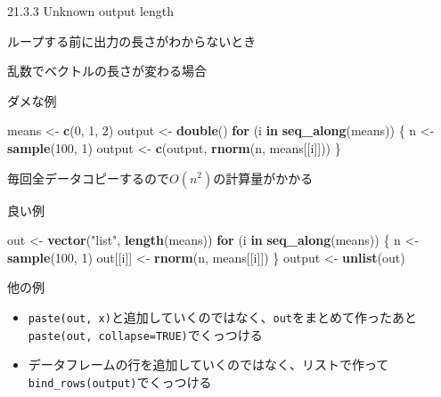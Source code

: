 \documentclass[ignorenonframetext,]{beamer}
\newenvironment{Shaded}{\begin{snugshade}}{\end{snugshade}}
\newcommand{\KeywordTok}[1]{\textcolor[rgb]{0.13,0.29,0.53}{\textbf{#1}}}
\newcommand{\DecValTok}[1]{\textcolor[rgb]{0.00,0.00,0.81}{#1}}
\newcommand{\StringTok}[1]{\textcolor[rgb]{0.31,0.60,0.02}{#1}}
\newcommand{\ControlFlowTok}[1]{\textcolor[rgb]{0.13,0.29,0.53}{\textbf{#1}}}
\newcommand{\NormalTok}[1]{#1}
\providecommand{\tightlist}{%
  \setlength{\itemsep}{0pt}\setlength{\parskip}{0pt}}
\begin{document}
\begin{frame}{21.3.3 Unknown output length}

ループする前に出力の長さがわからないとき

\end{frame}

\begin{frame}[fragile]{乱数でベクトルの長さが変わる場合}

\begin{block}{ダメな例}

\begin{Shaded}
\begin{Highlighting}[]
\NormalTok{means <-}\StringTok{ }\KeywordTok{c}\NormalTok{(}\DecValTok{0}\NormalTok{, }\DecValTok{1}\NormalTok{, }\DecValTok{2}\NormalTok{)}
\NormalTok{output <-}\StringTok{ }\KeywordTok{double}\NormalTok{()}
\ControlFlowTok{for}\NormalTok{ (i }\ControlFlowTok{in} \KeywordTok{seq_along}\NormalTok{(means)) \{}
\NormalTok{  n <-}\StringTok{ }\KeywordTok{sample}\NormalTok{(}\DecValTok{100}\NormalTok{, }\DecValTok{1}\NormalTok{)}
\NormalTok{  output <-}\StringTok{ }\KeywordTok{c}\NormalTok{(output, }\KeywordTok{rnorm}\NormalTok{(n, means[[i]]))}
\NormalTok{\}}
\end{Highlighting}
\end{Shaded}

毎回全データコピーするので\(O(n^2)\)の計算量がかかる

\end{block}

\end{frame}

\begin{frame}[fragile]{良い例}

\begin{Shaded}
\begin{Highlighting}[]
\NormalTok{out <-}\StringTok{ }\KeywordTok{vector}\NormalTok{(}\StringTok{"list"}\NormalTok{, }\KeywordTok{length}\NormalTok{(means))}
\ControlFlowTok{for}\NormalTok{ (i }\ControlFlowTok{in} \KeywordTok{seq_along}\NormalTok{(means)) \{}
\NormalTok{  n <-}\StringTok{ }\KeywordTok{sample}\NormalTok{(}\DecValTok{100}\NormalTok{, }\DecValTok{1}\NormalTok{)}
\NormalTok{  out[[i]] <-}\StringTok{ }\KeywordTok{rnorm}\NormalTok{(n, means[[i]])}
\NormalTok{\}}
\NormalTok{output <-}\StringTok{ }\KeywordTok{unlist}\NormalTok{(out)}
\end{Highlighting}
\end{Shaded}

\begin{block}{他の例}

\begin{itemize}
\tightlist
\item
  \texttt{paste(out,\ x)}と追加していくのではなく、\texttt{out}をまとめて作ったあと\texttt{paste(out,\ collapse=TRUE)}でくっつける
\item
  データフレームの行を追加していくのではなく、リストで作って\texttt{bind\_rows(output)}でくっつける
\end{itemize}

\end{block}

\end{frame}
\end{document}
